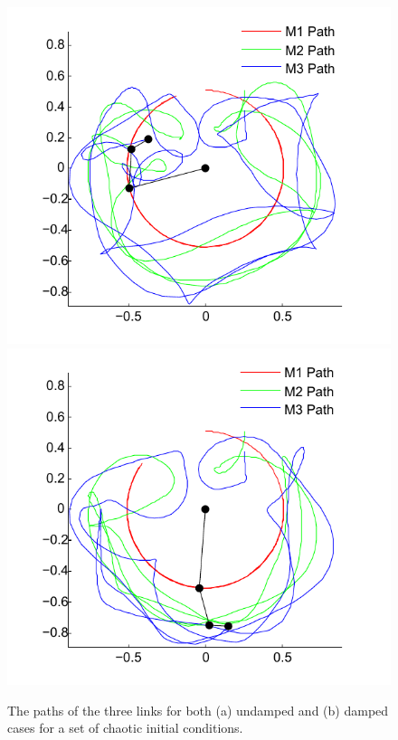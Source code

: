 \begin{figure}[H]
\centering
\includegraphics[scale=0.65]{path_nodamping.pdf}
\includegraphics[scale=0.65]{path_damping.pdf}
\caption{The paths of the three links for both (a) undamped and (b) damped cases for a set of chaotic initial conditions.}
\label{paths}
\end{figure}


